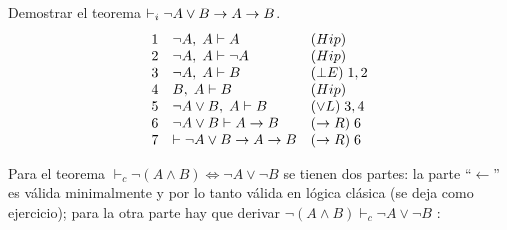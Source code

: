 \documentclass[11pt,letterpaper]{article}
\begin{document}
\item Demostrar el teorema $\vdash_i \neg A\lor B\imp A\imp B$.
\[
\ba{rll}
1 & \neg A,\; A \vdash A & (Hip)\\
2 & \neg A,\; A \vdash \neg A & (Hip)\\
3 & \neg A, \;A \vdash B & (\bot E)\; 1,2\\
4 & B,\; A\vdash B & (Hip)\\
5 & \neg A\lor B,\; A\vdash B & (\lor L)\; 3,4\\
6 & \neg A\lor B \vdash A \to B & (\to R) \;6  \\
7 &      \vdash \neg A\lor B \to A \to B & (\to R) \; 6
\ea
\]

\begin{comment}

\item Para demostrar $\vdash_i A\lor\neg A\imp \neg\neg A\imp A$ basta mostrar
$A\lor\neg A,\neg\neg A\vdash A$.
\[
\ba{rll}
1. & A\lor \neg A,\neg \neg A\vdash A\lor \neg A & (Hip)\\
2. & A\lor \neg A,\neg \neg A,A\vdash A & (Hip)\\
3. & A\lor \neg A,\neg \neg A,\neg A\vdash \neg A & (Hip)\\
4. & A\lor \neg A,\neg \neg A,\neg A\vdash \neg\neg A & (Hip)\\
5. & A\lor \neg A,\neg \neg A,\neg A\vdash \bot & (\imp E)\;3,4\\
6. & A\lor \neg A,\neg \neg A,\neg A\vdash A & (\bot E)\;5\\
7. & A\lor \neg A,\neg \neg A\vdash A & (\lor E)\;1,2,6\\
\ea
\]

\item El teorema $\vdash_c \neg\neg A\iff A$ se demuestra en dos partes. La 
parte $\vdash A\imp\neg\neg A$ ya fue probada. Basta probar 
entonces $\vdash\neg\neg A\imp A$, es decir, $\neg\neg A\vdash
A$. Pero esto es inmediato por la regla $(\neg\neg E)$.\\

\end{comment}

\item Para el teorema $\vdash_c \neg(A\land B)\iff \neg A\lor\neg B$ se tienen 
dos partes: la parte \enquote{$\leftarrow$} es válida minimalmente y por lo 
tanto v\'alida en l\'ogica cl\'asica (se deja como ejercicio); para la otra 
parte hay que derivar 
$\neg(A\land B)\vdash_c \neg A\lor \neg B$ :
\end{document}
